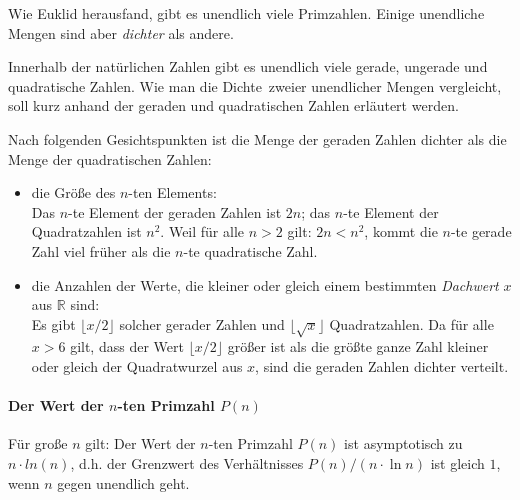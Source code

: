 \begin{refsegment}
Wie Euklid herausfand, gibt es unendlich viele Primzahlen. Einige unendliche
Mengen sind aber {\em dichter}  als andere.

Innerhalb der natürlichen Zahlen gibt es unendlich viele gerade, ungerade
und quadratische Zahlen. Wie man die \glqq Dichte\grqq~zweier unendlicher Mengen
vergleicht, soll kurz anhand der geraden und quadratischen Zahlen erläutert
werden.

Nach folgenden Gesichtspunkten ist die Menge der geraden Zahlen dichter als
die Menge der quadratischen Zahlen:\footnotemark
\begin{itemize}
  \item die Größe des $n$-ten Elements: \\
    Das $n$-te Element der geraden Zahlen ist $2n$;
    das $n$-te Element der Quadratzahlen ist $n^2$.
    Weil für alle $n>2$ gilt: $2n < n^2$, kommt die $n$-te gerade Zahl viel
    früher als die $n$-te quadratische Zahl.
  \item die Anzahlen der Werte, die kleiner oder gleich einem bestimmten
    {\em Dachwert} $x$ aus ${\mathbb R}$ sind: \\
    Es gibt $\lfloor x/2 \rfloor$ solcher gerader Zahlen und
    $\lfloor \sqrt{x} \rfloor$ Quadratzahlen.
    Da für alle $x>6$ gilt, dass der Wert $\lfloor x/2 \rfloor$ größer ist als
    die größte ganze Zahl kleiner oder gleich der Quadratwurzel aus $x$,
    sind die geraden Zahlen dichter verteilt. %
\end{itemize}


\paragraph*{Der Wert der $n$-ten Primzahl $P(n)$}%
%

\begin{satz}\label{thm-pz-density}
Für große $n$ gilt: Der Wert der $n$-ten Primzahl $P(n)$ ist
asymptotisch zu $n \cdot ln(n)$, d.h. der Grenzwert des
Verhältnisses  $P(n)/(n\cdot \ln n)$ ist gleich $1$, wenn $n$
gegen unendlich geht.
\end{satz}


\end{refsegment}
